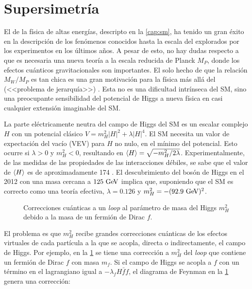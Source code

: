 \section{Supersimetría}
\label{cap:susy}

El {\SM} de la física de altas energías, descripto en la \cref{cap:sm}, ha
tenido un gran éxito en la descripción de los fenómenos conocidos hasta la
escala del {\tev} explorados por los experimentos en los últimos a\~nos. A pesar
de esto, no hay dudas respecto a que es necesaria una nueva teoría a la escala
reducida de Planck $M_P$, donde los efectos cuánticos gravitacionales son
importantes. El solo hecho de que la relación $M_W/M_P$ es tan chica es una
gran motivación para la física más allá del {\SM} (<<problema de jerarquía>>) \cite{Martin:1997ns}.
Esta no es una dificultad intrínseca del SM, sino una
preocupante sensibilidad del potencial de Higgs a nueva física en casi cualquier
extensión imaginable del SM.

La parte eléctricamente neutra del campo de Higgs del SM es un escalar complejo
$H$ con un potencial clásico $V=m_H^2 |H|^2 + \lambda|H|^4$. El SM necesita un
valor de expectación del vacío (VEV) para $H$ no nulo, en el mínimo del potencial.
Esto ocurre si $\lambda>0$ y $m_H^2<0$, resultando en $\langle H \rangle = \sqrt{-m_H^2/2\lambda}$.
Experimentalmente, de las medidas de las propiedades de las interacciones
débiles, se sabe que el valor de $\langle H \rangle$ es de aproximadamente 174 \gev.
El descubrimiento del bosón de Higgs en el 2012 con una masa cercana a $125 \gev$ implica que,
suponiendo que el SM es correcto como una teoría efectiva, $\lambda = 0.126$
y $m_H^2 = -(92.9 \gev)^2$.

\begin{figure}[!h]
  \centering 
  \caption{Correcciones cuánticas a un \emph{loop} al parámetro de masa del Higgs
    $m_H^2$ debido a la masa de un fermión de Dirac $f$.}
  \label{fig:higgs_corr_f}
\end{figure}

El problema es que $m_H^2$ recibe grandes correcciones cuánticas de los efectos
virtuales de cada partícula a la que se acopla, directa o indirectamente, el
campo de Higgs. Por ejemplo, en la \cref{fig:higgs_corr_f} se tiene una
corrección a $m_H^2$ del \emph{loop} que contiene un fermión de Dirac $f$ con masa
$m_f$. Si el campo de Higgs se acopla a $f$ con un término en el lagrangiano
igual a $-\lambda_f H \bar{f}f$, el diagrama de Feynman en la \cref{fig:higgs_corr_f} genera una corrección:


